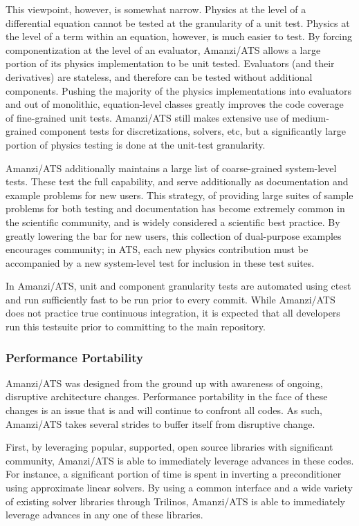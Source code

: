 This viewpoint, however, is somewhat narrow.
Physics at the level of a differential equation cannot be tested at the granularity of a unit test.
Physics at the level of a term within an equation, however, is much easier to test.
By forcing componentization at the level of an evaluator, Amanzi/ATS allows a large portion of its physics implementation to be unit tested.
Evaluators (and their derivatives) are stateless, and therefore can be tested without additional components.
Pushing the majority of the physics implementations into evaluators and out of monolithic, equation-level classes greatly improves the code coverage of fine-grained unit tests.
Amanzi/ATS still makes extensive use of medium-grained component tests for discretizations, solvers, etc, but a significantly large portion of physics testing is done at the unit-test granularity.

Amanzi/ATS additionally maintains a large list of coarse-grained system-level tests.
These test the full capability, and serve additionally as documentation and example problems for new users.
This strategy, of providing large suites of sample problems for both testing and documentation has become extremely common in the scientific community, and is widely considered a scientific best practice.
By greatly lowering the bar for new users, this collection of dual-purpose examples encourages community; in ATS, each new physics contribution must be accompanied by a new system-level test for inclusion in these test suites.

In Amanzi/ATS, unit and component granularity tests are automated using ctest and run sufficiently fast to be run prior to every commit.
While Amanzi/ATS does not practice true continuous integration, it is expected that all developers run this testsuite prior to committing to the main repository.


\subsubsection{Performance Portability}
\label{sec:amanzi:performance}
%
Amanzi/ATS was designed from the ground up with awareness of ongoing, disruptive architecture changes.
Performance portability in the face of these changes is an issue that is and will continue to confront all codes.
As such, Amanzi/ATS takes several strides to buffer itself from disruptive change.

First, by leveraging popular, supported, open source libraries with significant community, Amanzi/ATS is able to immediately leverage advances in these codes.
For instance, a significant portion of time is spent in inverting a preconditioner using approximate linear solvers.
By using a common interface and a wide variety of existing solver libraries through Trilinos, Amanzi/ATS is able to immediately leverage advances in any one of these libraries.


